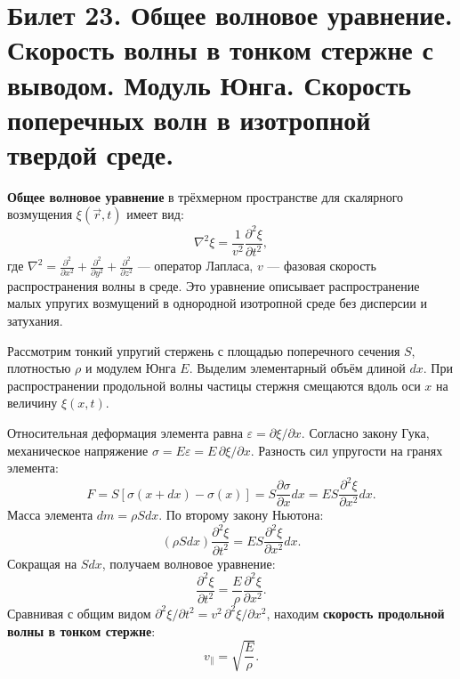\section{Билет 23. Общее волновое уравнение. Скорость волны в тонком стержне с выводом. Модуль Юнга. Скорость поперечных волн в изотропной твердой среде.}

\begin{definition}
\textbf{Общее волновое уравнение} в трёхмерном пространстве для скалярного возмущения $\xi(\vec{r}, t)$ имеет вид:
\begin{equation}
    \nabla^2 \xi = \frac{1}{v^2} \frac{\partial^2 \xi}{\partial t^2}, \label{eq:general_wave_23}
\end{equation}
где $\nabla^2 = \frac{\partial^2}{\partial x^2} + \frac{\partial^2}{\partial y^2} + \frac{\partial^2}{\partial z^2}$ --- оператор Лапласа, $v$ --- фазовая скорость распространения волны в среде. Это уравнение описывает распространение малых упругих возмущений в однородной изотропной среде без дисперсии и затухания.
\end{definition}

\begin{theorem}
Рассмотрим тонкий упругий стержень с площадью поперечного сечения $S$, плотностью $\rho$ и модулем Юнга $E$. Выделим элементарный объём длиной $dx$. При распространении продольной волны частицы стержня смещаются вдоль оси $x$ на величину $\xi(x,t)$.

Относительная деформация элемента равна $\varepsilon = \partial \xi / \partial x$. Согласно закону Гука, механическое напряжение $\sigma = E \varepsilon = E \, \partial \xi / \partial x$. Разность сил упругости на гранях элемента:
\begin{equation}
    F = S[\sigma(x+dx) - \sigma(x)] = S \frac{\partial \sigma}{\partial x} dx = ES \frac{\partial^2 \xi}{\partial x^2} dx.
\end{equation}
Масса элемента $dm = \rho S dx$. По второму закону Ньютона:
\begin{equation}
    (\rho S dx) \frac{\partial^2 \xi}{\partial t^2} = ES \frac{\partial^2 \xi}{\partial x^2} dx.
\end{equation}
Сокращая на $S dx$, получаем волновое уравнение:
\begin{equation}
    \frac{\partial^2 \xi}{\partial t^2} = \frac{E}{\rho} \frac{\partial^2 \xi}{\partial x^2}.
\end{equation}
Сравнивая с общим видом $\partial^2 \xi / \partial t^2 = v^2 \, \partial^2 \xi / \partial x^2$, находим \textbf{скорость продольной волны в тонком стержне}:
\begin{equation}
    v_{\parallel} = \sqrt{\frac{E}{\rho}}. \label{eq:rod_speed}
\end{equation}
\end{theorem}

